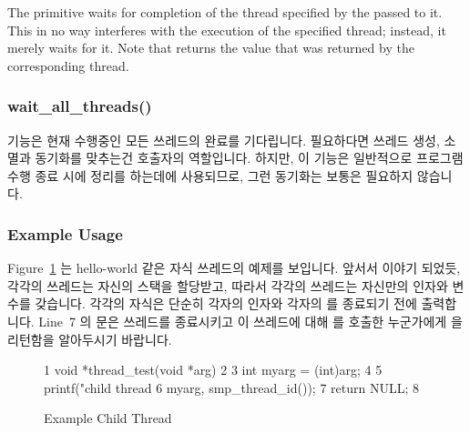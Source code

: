 The  primitive waits for completion of the thread
specified by the  passed to it.
This in no way interferes with the execution of the specified thread;
instead, it merely waits for it.
Note that  returns the value that was returned by
the corresponding thread.
\fi

\subsubsection{wait\_all\_threads()}

 기능은 현재 수행중인 모든 쓰레드의 완료를 기다립니다.
필요하다면 쓰레드 생성, 소멸과 동기화를 맞추는건 호출자의 역할입니다.
하지만, 이 기능은 일반적으로 프로그램 수행 종료 시에 정리를 하는데에
사용되므로, 그런 동기화는 보통은 필요하지 않습니다.

\subsubsection{Example Usage}

Figure~\ref{fig:toolsoftrade:Example Child Thread}
는 hello-world 같은 자식 쓰레드의 예제를 보입니다.
앞서서 이야기 되었듯, 각각의 쓰레드는 자신의 스택을 할당받고, 따라서 각각의
쓰레드는 자신만의  인자와  변수를 갖습니다.
각각의 자식은 단순히 각자의 인자와 각자의  를 종료되기 전에
출력합니다.
Line~7 의  문은 쓰레드를 종료시키고 이 쓰레드에 대해
 를 호출한 누군가에게  을 리턴함을 알아두시기
바랍니다.

\begin{figure}[tbp]
{ \scriptsize
\begin{verbbox}
  1 void *thread_test(void *arg)
  2 {
  3   int myarg = (int)arg;
  4
  5   printf("child thread %
  6          myarg, smp_thread_id());
  7   return NULL;
  8 }
\end{verbbox}
}
\centering
\theverbbox
\caption{Example Child Thread}
\label{fig:toolsoftrade:Example Child Thread}
\end{figure}

